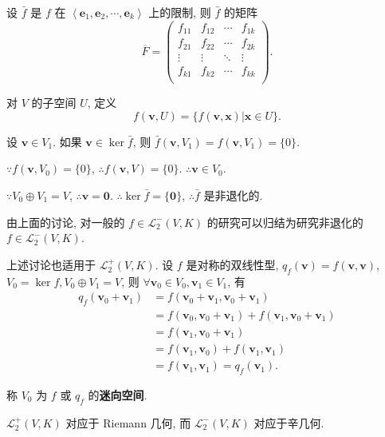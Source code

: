 \documentclass[color=black,device=normal,lang=cn,mode=geye]{elegantnote}
\begin{document}
设 $\bar{f}$ 是 $f$ 在 $\left<\boldsymbol{e}_1,\boldsymbol{e}_2,\cdots,\boldsymbol{e}_k\right>$ 上的限制, 则 $\bar{f}$ 的矩阵
\[\overline{F}=\begin{pmatrix}
    f_{11} & f_{12} & \cdots & f_{1k} \\
    f_{21} & f_{22} & \cdots & f_{2k} \\
    \vdots & \vdots & \ddots & \vdots \\
    f_{k1} & f_{k2} & \cdots & f_{kk} \\
\end{pmatrix}.\]

对 $V$ 的子空间 $U$, 定义
\[f(\boldsymbol{v},U)=\{f(\boldsymbol{v},\boldsymbol{x})|\boldsymbol{x}\in U\}.\]

设 $\boldsymbol{v}\in V_1$. 如果 $\boldsymbol{v}\in\ker\bar{f}$, 则 $\bar{f}(\boldsymbol{v},V_1)=f(\boldsymbol{v},V_1)=\{0\}$.

$\because f(\boldsymbol{v},V_0)=\{0\}$, $\therefore f(\boldsymbol{v},V)=\{0\}$. $\therefore\boldsymbol{v}\in V_0$.

$\because V_0\oplus V_1=V$, $\therefore\boldsymbol{v}=\boldsymbol{0}$. $\therefore\ker\bar{f}=\{\boldsymbol{0}\}$, $\therefore\bar{f}$ 是非退化的.

由上面的讨论, 对一般的 $f\in\mathcal{L}_2^-(V,K)$ 的研究可以归结为研究非退化的 $f\in\mathcal{L}_2^-(V,K)$.

上述讨论也适用于 $\mathcal{L}_2^+(V,K)$. 设 $f$ 是对称的双线性型, $q_f(\boldsymbol{v})=f(\boldsymbol{v},\boldsymbol{v})$, $V_0=\ker f,V_0\oplus V_1=V$, 则 $\forall\boldsymbol{v}_0\in V_0,\boldsymbol{v}_1\in V_1$, 有
\begin{align*}
    q_f(\boldsymbol{v}_0+\boldsymbol{v}_1) & =f(\boldsymbol{v}_0+\boldsymbol{v}_1,\boldsymbol{v}_0+\boldsymbol{v}_1) \\
    & =f(\boldsymbol{v}_0,\boldsymbol{v}_0+\boldsymbol{v}_1)+f(\boldsymbol{v}_1,\boldsymbol{v}_0+\boldsymbol{v}_1) \\
    & =f(\boldsymbol{v}_1,\boldsymbol{v}_0+\boldsymbol{v}_1) \\
    & =f(\boldsymbol{v}_1,\boldsymbol{v}_0)+f(\boldsymbol{v}_1,\boldsymbol{v}_1) \\
    & =f(\boldsymbol{v}_1,\boldsymbol{v}_1)=q_f(\boldsymbol{v}_1).
\end{align*}

称 $V_0$ 为 $f$ 或 $q_f$ 的\textbf{迷向空间}.

$\mathcal{L}_2^+(V,K)$ 对应于 Riemann 几何, 而 $\mathcal{L}_2^-(V,K)$ 对应于辛几何.
\end{document}
